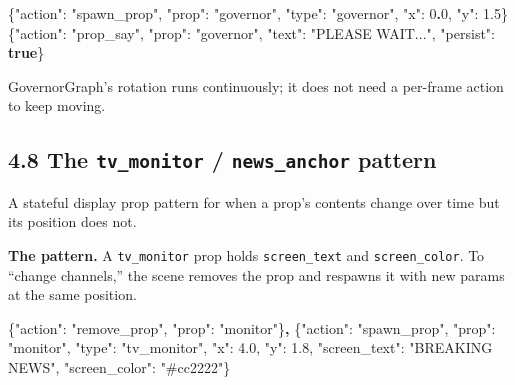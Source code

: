 \documentclass[
  12pt,
  letterpaper,
]{book}
\newenvironment{Shaded}{}{}
\newcommand{\DataTypeTok}[1]{\textcolor[rgb]{0.56,0.13,0.00}{#1}}
\newcommand{\DecValTok}[1]{\textcolor[rgb]{0.25,0.63,0.44}{#1}}
\newcommand{\ErrorTok}[1]{\textcolor[rgb]{1.00,0.00,0.00}{\textbf{#1}}}
\newcommand{\FloatTok}[1]{\textcolor[rgb]{0.25,0.63,0.44}{#1}}
\newcommand{\FunctionTok}[1]{\textcolor[rgb]{0.02,0.16,0.49}{#1}}
\newcommand{\KeywordTok}[1]{\textcolor[rgb]{0.00,0.44,0.13}{\textbf{#1}}}
\newcommand{\StringTok}[1]{\textcolor[rgb]{0.25,0.44,0.63}{#1}}
\begin{document}
\begin{Shaded}
\begin{Highlighting}[]
\FunctionTok{\{}\DataTypeTok{"action"}\FunctionTok{:} \StringTok{"spawn\_prop"}\FunctionTok{,} \DataTypeTok{"prop"}\FunctionTok{:} \StringTok{"governor"}\FunctionTok{,}
 \DataTypeTok{"type"}\FunctionTok{:} \StringTok{"governor"}\FunctionTok{,} \DataTypeTok{"x"}\FunctionTok{:} \DecValTok{0}\ErrorTok{.}\DecValTok{0}\FunctionTok{,} \DataTypeTok{"y"}\FunctionTok{:} \FloatTok{1.5}\FunctionTok{\}}
\FunctionTok{\{}\DataTypeTok{"action"}\FunctionTok{:} \StringTok{"prop\_say"}\FunctionTok{,} \DataTypeTok{"prop"}\FunctionTok{:} \StringTok{"governor"}\FunctionTok{,}
 \DataTypeTok{"text"}\FunctionTok{:} \StringTok{"PLEASE WAIT..."}\FunctionTok{,} \DataTypeTok{"persist"}\FunctionTok{:} \KeywordTok{true}\FunctionTok{\}}
\end{Highlighting}
\end{Shaded}

GovernorGraph's rotation runs continuously; it does not need a per-frame
action to keep moving.

\subsection{\texorpdfstring{4.8 The \texttt{tv\_monitor} /
\texttt{news\_anchor}
pattern}{4.8 The tv\_monitor / news\_anchor pattern}}\label{the-tv_monitor-news_anchor-pattern}

A stateful display prop pattern for when a prop's contents change over
time but its position does not.

\textbf{The pattern.} A \texttt{tv\_monitor} prop holds
\texttt{screen\_text} and \texttt{screen\_color}. To ``change
channels,'' the scene removes the prop and respawns it with new params
at the same position.

\begin{Shaded}
\begin{Highlighting}[]
\FunctionTok{\{}\DataTypeTok{"action"}\FunctionTok{:} \StringTok{"remove\_prop"}\FunctionTok{,} \DataTypeTok{"prop"}\FunctionTok{:} \StringTok{"monitor"}\FunctionTok{\}}\ErrorTok{,}
\FunctionTok{\{}\DataTypeTok{"action"}\FunctionTok{:} \StringTok{"spawn\_prop"}\FunctionTok{,} \DataTypeTok{"prop"}\FunctionTok{:} \StringTok{"monitor"}\FunctionTok{,}
 \DataTypeTok{"type"}\FunctionTok{:} \StringTok{"tv\_monitor"}\FunctionTok{,} \DataTypeTok{"x"}\FunctionTok{:} \FloatTok{4.0}\FunctionTok{,} \DataTypeTok{"y"}\FunctionTok{:} \FloatTok{1.8}\FunctionTok{,}
 \DataTypeTok{"screen\_text"}\FunctionTok{:} \StringTok{"BREAKING NEWS"}\FunctionTok{,} \DataTypeTok{"screen\_color"}\FunctionTok{:} \StringTok{"\#cc2222"}\FunctionTok{\}}
\end{Highlighting}
\end{Shaded}
\end{document}
